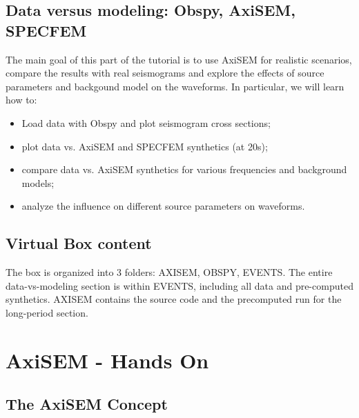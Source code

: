 \documentclass{article}
\begin{document}
\subsection{Data versus modeling: Obspy, AxiSEM, SPECFEM}
The main goal of this part of the tutorial is to use AxiSEM for realistic scenarios, compare the 
results with real seismograms and explore the effects of source parameters and 
backgound model on the waveforms. In particular, we will learn how to:

\begin{itemize}
    \item Load data with Obspy and plot seismogram cross sections;
    \item plot data vs. AxiSEM and SPECFEM synthetics (at 20s);
    \item compare data vs. AxiSEM synthetics for various frequencies and background
          models;
    \item analyze the influence on different source parameters on waveforms.
\end{itemize}


\subsection{Virtual Box content}
The box is organized into 3 folders: AXISEM, OBSPY, EVENTS. The entire
data-vs-modeling section is within EVENTS, including all data and pre-computed
synthetics. AXISEM contains the source code and the precomputed run
for the long-period section.


\newpage

\section{AxiSEM - Hands On}

\subsection{The AxiSEM Concept}
\end{document}
